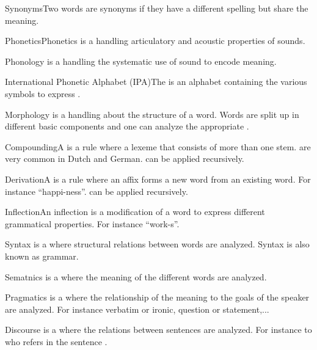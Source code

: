 \begin{df}{Synonyms}Two words are synonyms if they have a different spelling but share the meaning.
\end{df}
\begin{df}{Phonetics}Phonetics is a \alnlp{} handling articulatory and acoustic properties of sounds.
\end{df}
\begin{df}{Phonology}\sb{} is a \alnlp{} handling the systematic use of sound to encode meaning.
\end{df}
\begin{df}{International Phonetic Alphabet (IPA)}The \sb{} is an alphabet containing the various symbols to express \pnc{}.
\end{df}
\begin{df}{Morphology}\sb{} is a \alnlp{} handling about the structure of a word. Words are split up in different basic components and one can analyze the appropriate \pos{}.
\end{df}
\begin{df}{Compounding}A \sb{} is a \mpcl{} rule where a lexeme that consists of more than one stem. \sb{} are very common in Dutch and German. \sb{} can be applied recursively.
\end{df}
\begin{df}{Derivation}A \sb{} is a \mpcl{} rule where an affix forms a new word from an existing word. For instance ``happi-ness''. \sb{} can be applied recursively.
\end{df}
\begin{df}{Inflection}An inflection is a modification of a word to express different grammatical properties. For instance ``work-s''.
\end{df}
\begin{df}{Syntax}\sb{} is a \alnlp{} where structural relations between words are analyzed. Syntax is also known as grammar.
\end{df}
\begin{df}{Sematnics}\sb{} is a \alnlp{} where the meaning of the different words are analyzed.
\end{df}
\begin{df}{Pragmatics}\sb{} is a \alnlp{} where the relationship of the meaning to the goals of the speaker are analyzed. For instance verbatim or ironic, question or statement,...
\end{df}
\begin{df}{Discourse}\sb{} is a \alnlp{} where the relations between sentences are analyzed. For instance to who refers  in the sentence .
\end{df}
